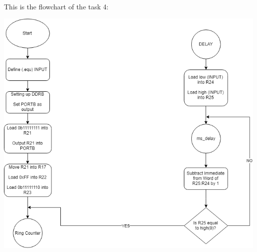 \documentclass[a4paper,12pt]{article}
\begin{document}
\newpage
This is the flowchart of the task 4:
\begin{center}
\includegraphics[scale=0.7]{img/Task4.png}
\end{center}


\end{document}

